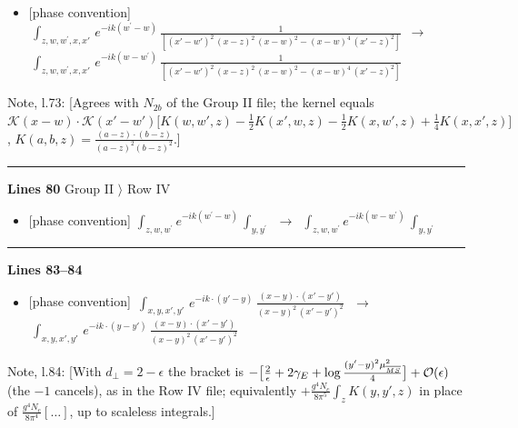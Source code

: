 \documentclass[10pt]{article}
\newenvironment{notebox}{\def\FrameCommand{{\color{notebar}\vrule width 1.5pt}\hspace{6pt}}\MakeFramed{\advance\hsize-\width\FrameRestore}\small}{\endMakeFramed}
\begin{document}
\begin{itemize}[leftmargin=2.2em,itemsep=1pt,topsep=2pt]
\item[\textbf{l.72}] \textsf{\small [phase convention]} $\displaystyle \,\int_{z,w,w^{\prime},x,x'}\, e^{-ik(w^{\prime}-w)}\, \frac{1}{[(x'-w')^{2}\,(x-z)^{2}\,(x-w)^{2} - (x-w)^{4}\, (x'-z)^{2}]}$\ $\longrightarrow$\ $\displaystyle \,\int_{z,w,w^{\prime},x,x'}\, e^{-ik(w-w^{\prime})}\, \frac{1}{[(x'-w')^{2}\,(x-z)^{2}\,(x-w)^{2} - (x-w)^{4}\, (x'-z)^{2}]}$
\end{itemize}
\begin{notebox}\textsf{\small Note, l.73:} [Agrees with $N_{2b}$ of the Group II file; the kernel equals $\mathcal{K}(x-w)\cdot\mathcal{K}(x'-w')\big[K(w,w',z)-\frac12K(x',w,z)-\frac12K(x,w',z)+\frac14K(x,x',z)\big]$, $K(a,b,z)=\frac{(a-z)\cdot(b-z)}{(a-z)^{2}(b-z)^{2}}$.]\end{notebox}
\noindent\rule{\linewidth}{0.3pt}\par\noindent\textbf{Lines 80} \quad \textsf{Group II $\rangle$ Row IV} \par
\begin{itemize}[leftmargin=2.2em,itemsep=1pt,topsep=2pt]
\item[\textbf{l.80}] \textsf{\small [phase convention]} $\displaystyle \int_{z,w,w^{\prime}} e^{-ik(w^{\prime}-w)}\, \int_{y,y^{\prime}}$\ $\longrightarrow$\ $\displaystyle \int_{z,w,w^{\prime}} e^{-ik(w-w^{\prime})}\, \int_{y,y^{\prime}}$
\end{itemize}
\noindent\rule{\linewidth}{0.3pt}\par\noindent\textbf{Lines 83--84} \par
\begin{itemize}[leftmargin=2.2em,itemsep=1pt,topsep=2pt]
\item[\textbf{l.83}] \textsf{\small [phase convention]} $\displaystyle \,\int_{x,y,x',y'}\,e^{-ik\cdot (y'-y)}\,\frac{(x-y)\cdot (x'-y')}{(x-y)^{2}\,(x'-y')^{2}}\,$\ $\longrightarrow$\ $\displaystyle \,\int_{x,y,x',y'}\,e^{-ik\cdot (y-y')}\,\frac{(x-y)\cdot (x'-y')}{(x-y)^{2}\,(x'-y')^{2}}\,$
\end{itemize}
\begin{notebox}\textsf{\small Note, l.84:} [With $d_{\perp}=2-\epsilon$ the bracket is $-\big[\frac{2}{\epsilon}+2\gamma_{E}+\log\frac{(y'-y)^{2}\mu^{2}_{\overline{MS}}}{4}\big]+{\cal O}(\epsilon)$ (the $-1$ cancels), as in the Row IV file; equivalently $+\frac{g^{4}N_{c}}{8\pi^{5}}\int_{z}K(y,y',z)$ in place of $\frac{g^{4}N_{c}}{8\pi^{4}}[\dots]$, up to scaleless integrals.]\end{notebox}
\end{document}
